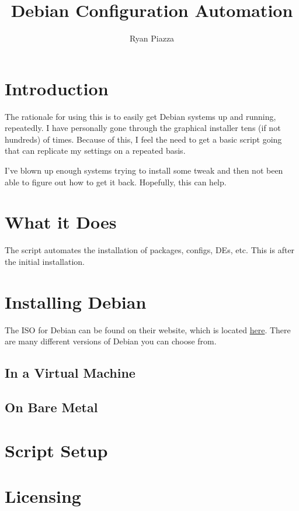 \documentclass{article}
\title{Debian Configuration Automation}
\author{Ryan Piazza}
\begin{document}
\tableofcontents

\maketitle


\section{Introduction}

The rationale for using this is to easily get Debian systems up and running, repeatedly. I have personally gone through the graphical installer tens (if not hundreds) of times. Because of this, I feel the need to get a basic script going that can replicate my settings on a repeated basis. 

I've blown up enough systems trying to install some tweak and then not been able to figure out how to get it back. Hopefully, this can help. 


\section{What it Does}

The script automates the installation of packages, configs, DEs, etc. This is after the initial installation. 

\blindtext

\section{Installing Debian}

The ISO for Debian can be found on their website, which is located \href{https://www.debian.org/distrib/}{here}. There are many different versions of Debian you can choose from. 

\subsection{In a Virtual Machine}

\blindtext

\subsection{On Bare Metal}

\blindtext

\section{Script Setup}

\blindtext

\section{Licensing}

\blindtext
\end{document}
